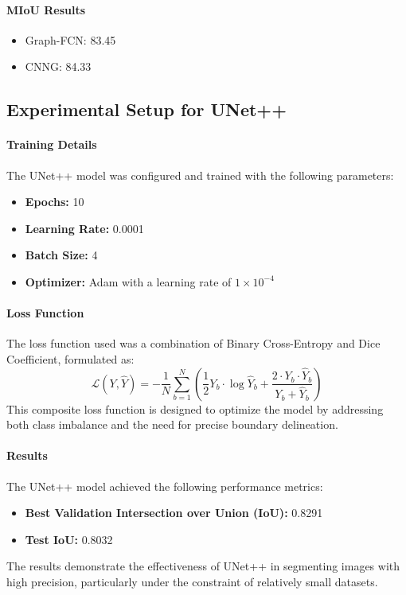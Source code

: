 \paragraph{MIoU Results}
\begin{itemize}
    \item Graph-FCN: 83.45
    \item CNNG: 84.33
\end{itemize}

\subsection{Experimental Setup for UNet++}

\paragraph{Training Details}
The UNet++ model was configured and trained with the following parameters:
\begin{itemize}
    \item \textbf{Epochs:} 10
    \item \textbf{Learning Rate:} 0.0001
    \item \textbf{Batch Size:} 4
    \item \textbf{Optimizer:} Adam with a learning rate of $1 \times 10^{-4}$
\end{itemize}

\paragraph{Loss Function}
The loss function used was a combination of Binary Cross-Entropy and Dice Coefficient, formulated as:
\[
\mathcal{L}(Y, \hat{Y}) = -\frac{1}{N} \sum_{b=1}^N \left( \frac{1}{2} Y_b \cdot \log \hat{Y}_b + \frac{2 \cdot Y_b \cdot \hat{Y}_b}{Y_b + \hat{Y}_b} \right)
\]
This composite loss function is designed to optimize the model by addressing both class imbalance and the need for precise boundary delineation.

\paragraph{Results}
The UNet++ model achieved the following performance metrics:
\begin{itemize}
    \item \textbf{Best Validation Intersection over Union (IoU):} 0.8291
    \item \textbf{Test IoU:} 0.8032
\end{itemize}

The results demonstrate the effectiveness of UNet++ in segmenting images with high precision, particularly under the constraint of relatively small datasets.
